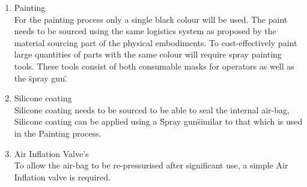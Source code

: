 \begin{enumerate}
          The process of creating an interlocking joint requires the use of
          springs. To self-produce the required spring is unnecessarily
          expensive thus sourcing spring on their own will be done. This
          physical embodiment is already provided for by the material sourcing
          section.
        \item Painting \\
          For the painting process only a single black colour will be used. The
          paint needs to be sourced using the same logistics system as proposed
          by the material sourcing part of the physical embodiments. To
          cost-effectively paint large quantities of parts with the same colour
          will require spray painting tools. These tools consist of both
          consumable masks for operators as well as the \"spray gun\".
        \item Silicone coating \\
          Silicone coating needs to be sourced to be able to seal the internal
          air-bag, Silicone coating can be applied using a \"Spray gun\" similar
          to that which is used in the Painting process.
        \item Air Inflation Valve's  \\
          To allow the air-bag to be re-pressurised after significant use, a simple
          Air Inflation valve is required.
      \end{enumerate}
